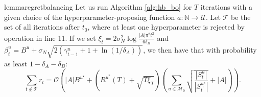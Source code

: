 \documentclass{article}
\theoremstyle{plain}
\theoremstyle{definition}
\theoremstyle{remark}
\theoremstyle{plain}
\begin{document}
\begin{restatable}[]{lemma}{regretbalancing} \label{lemma:regretbalancing}
    Let us run Algorithm \ref{alg:hb_bo} for $T$ iterations with a given choice of the hyperparameter-proposing function $a: \mathbb{N} \to \mathcal{U}$. Let $\mathcal{T}$ be the set of all iterations after $t_0$, where at least one hyperparameter is rejected by operation in line 11. If we set $\xi_t = 2 \sigma_N^2 \log \frac{|A|\pi^2 t^2}{6\delta_B}$ and $\beta^{u}_t = B^u + \sigma_N \sqrt{2 (\gamma^{u}_{t-1} + 1 + \ln (1/\delta_A))}$, we then have that with probability as least $1 - \delta_A - \delta_B$:
    \begin{equation*}
\sum_{t \notin \mathcal{T}} r_t = \mathcal{O} \left(|A|B^{u^\star} + \left(R^{u^*}(T) + \sqrt{T\xi_T}  \right) \left(\sum_{u \in \mathcal{M}_0}\sqrt{\frac{|S_t^{u}|}{|S_{t^\prime}^{u^\star}|}} + |A| \right) \right) .
\end{equation*}


\end{restatable}
\end{document}
